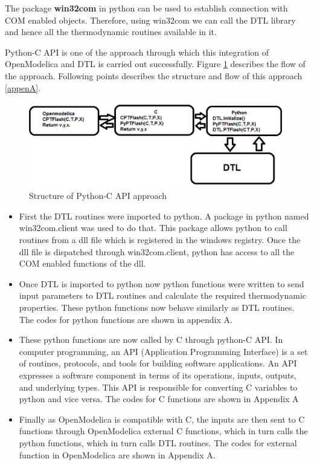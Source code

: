 \documentclass[12pt]{report}
\begin{document}
The package \textbf{win32com} in python can be used to establish connection with COM enabled objects. Therefore, using win32com we can call the DTL library and hence all the thermodynamic routines available in it.

Python-C API is one of the approach through which this integration of OpenModelica and DTL is carried out successfully. Figure \ref{fig:PyC1} describes the flow of the approach. Following points describes the structure and flow of this approach \ref{appenA}.

\begin{figure}
\centering
\includegraphics[width=1\linewidth]{PytC1}
\caption{Structure of Python-C API approach}
\label{fig:PyC1}
\end{figure}
\begin{itemize}
\item{First the DTL routines were imported to python. A package in python named win32com.client was used to do that. This package allows python to call routines from a dll file which is registered in the windows registry. Once the dll file is dispatched through win32com.client, python has access to all the COM enabled functions of the dll.}
\item{Once DTL is imported to python now python functions were written to send input parameters to DTL routines and calculate the required thermodynamic properties. These python functions now behave similarly as DTL routines. The codes for python functions are shown in appendix A.}
\item{These python functions are now called by C through python-C API. In computer programming, an API (Application Programming Interface) is a set of routines, protocols, and tools for building software applications. An API expresses a software component in terms of its operations, inputs, outputs, and underlying types. This API is responsible for converting C variables to python and vice versa. The codes for C functions are shown in Appendix A}
\item{Finally as OpenModelica is compatible with C, the inputs are then sent to C functions through OpenModelica external C functions, which in turn calls the python functions, which in turn calls DTL routines. The codes for external function in OpenModelica are shown in Appendix A.}
\end{itemize}
\end{document}
